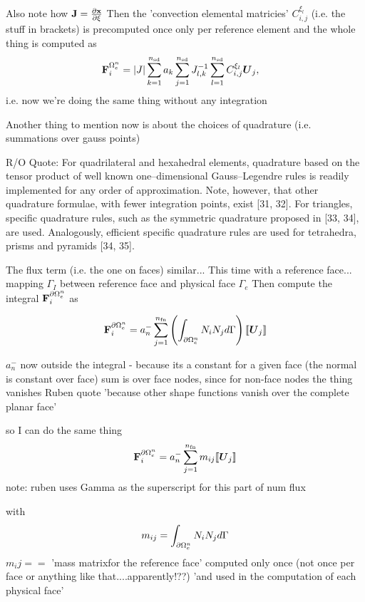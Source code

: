 Also note how $\mathbf{J} = \frac{\partial \mathbf{x}}{\partial \mathbf{\xi}}$
Then the 'convection elemental matricies' $ C_{i,j}^{\xi_l} $ (i.e. the stuff in brackets) is
precomputed once only per reference element
and the whole thing is computed as
\begin{align*}
\mathbf{F}^{\Omega_e^{n}}_{i} &= |J| \sum_{k=1}^{n_\textrm{sd}} a_k \sum_{j=1}^{n_\textrm{sd}} J_{l,k}^{-1} \sum_{l=1}^{n_\textrm{sd}} C_{i,j}^{\xi_l} \boldsymbol{U}_j ,
\end{align*}
i.e. now we're doing the same thing without any integration

Another thing to mention now is about the choices of quadrature (i.e. summations
over gauss points)

R/O Quote:
 For quadrilateral and hexahedral elements, quadrature
based on the tensor product of well known one–dimensional Gauss–Legendre
rules is readily implemented for any order of approximation. Note, however,
that other quadrature formulae, with fewer integration points, exist [31, 32].
For triangles, specific quadrature rules, such as the symmetric quadrature
proposed in [33, 34], are used. Analogously, efficient specific quadrature
rules are used for tetrahedra, prisms and pyramids [34, 35].

The flux term (i.e. the one on faces) similar...
This time with a reference face...
mapping $\Gamma_I$ between reference face and physical face $\Gamma_e$
Then compute the integral $\mathbf{F}^{\partial \Omega_e^{n}}_{i}$ as

$$
\mathbf{F}^{\partial \Omega_e^{n}}_{i} =
a_n^{-}
\sum_{j=1}^{n_\textrm{fn}}
\left( 
\int_{\partial \Omega_e^{n}} N_i N_j
  d\Gamma
 \right)
\llbracket \boldsymbol{U}_{j} \rrbracket \\
$$

$a_n^{-}$ now outside the integral - because its a constant for a given face
(the normal is constant over face)
sum is over face nodes, since for non-face nodes the thing vanishes
Ruben quote
'because other shape functions vanish over the complete planar face'

so I can do the same thing
$$
\mathbf{F}^{\partial \Omega_e^{n}}_{i} =
a_n^{-}
\sum_{j=1}^{n_\textrm{fn}}
m_{ij}
\llbracket \boldsymbol{U}_{j} \rrbracket \\
$$
note: ruben uses Gamma as the superscript for this part of num flux

with
$$
m_{ij} =
\int_{\partial \Omega_e^{n}} N_i N_j
  d\Gamma
$$
$m_ij ==$ 'mass matrixfor the reference face'
computed only once (not once per face or anything like that....apparently!??)
'and used in the computation of each physical face'

